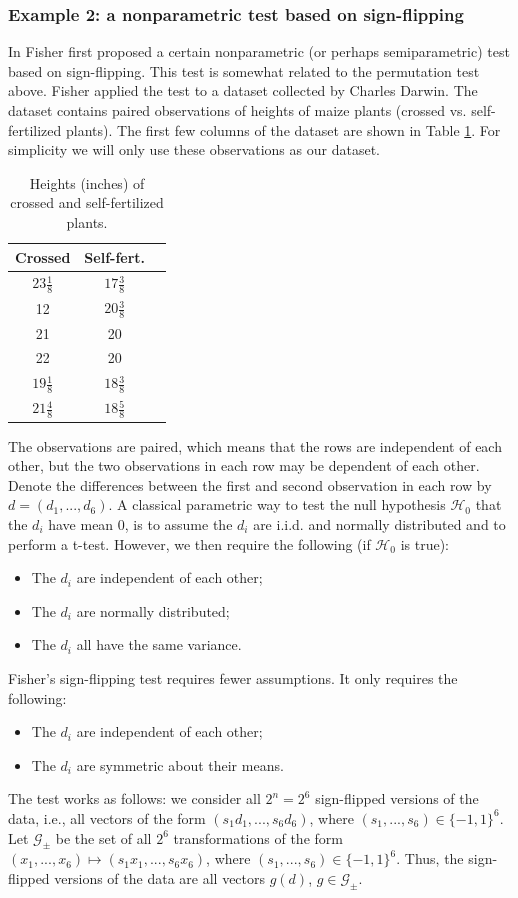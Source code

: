 \documentclass[11pt]{article}
\theoremstyle{plain}
\theoremstyle{definition}
\newcommand{\G}{\mathcal{G}}
\newcommand{\Hy}{\mathcal{H}}
\newcommand{\citt}{\citet}
\begin{document}
\subsubsection{Example 2: a nonparametric test based on sign-flipping} \label{secmaizeflip}

In \citt[][ch. IV]{fisher1935} Fisher first proposed a certain nonparametric (or perhaps semiparametric) test based on sign-flipping. This test is somewhat related to the permutation test above. Fisher applied the test to a dataset collected by Charles Darwin. The dataset contains paired observations of heights of maize plants (crossed vs. self-fertilized plants). The first few columns of the dataset are shown in Table \ref{tab:maizedata}. For simplicity we will only use these observations as our dataset.


\begin{table}[h]
\centering
\begin{tabular}{ccc}
\hline
Crossed & Self-fert.  \\
\hline
$23\frac{1}{8}$ & $17\frac{3}{8}$ \\
12 & $20\frac{3}{8}$  \\
21 & 20 \\
22 & 20\\
$19\frac{1}{8}$ & $18\frac{3}{8}$  \\
$21\frac{4}{8}$ & $18\frac{5}{8}$  \\
\hline
\end{tabular}
\caption{Heights (inches) of crossed and self-fertilized plants.}
\label{tab:maizedata}
\end{table}


 The observations are paired, which means that the rows are independent of each other, but the two observations in each row may be dependent of each other.
 Denote the differences between the first and second observation in each row by $d=(d_1,...,d_6)$.
A classical parametric way to test the null hypothesis  $\Hy_0$ that the $d_i$ have mean 0, is to assume the $d_i$ are i.i.d. and normally distributed and to perform a t-test. However, we then require the following (if $\Hy_0$ is true):
\begin{itemize}
\item The $d_i$ are independent of each other;
\item The $d_i$ are normally distributed;
\item The $d_i$ all have the same variance.
\end{itemize}
Fisher's sign-flipping test requires fewer assumptions. It only requires the following:
\begin{itemize}
\item The $d_i$ are independent of each other;
\item The $d_i$ are symmetric about their means.
\end{itemize}
The test works as follows: we consider all $2^n=2^6$ sign-flipped versions of the data, i.e., all vectors of the form $(s_1 d_1,...,s_6 d_6)$, where $(s_1,...,s_6)\in\{-1,1\}^6$. 
Let $\G_{\pm}$ be the set of all $2^6$ transformations of the form $(x_1,...,x_6)\mapsto (s_1x_1,...,s_6x_6)$, where $(s_1,...,s_6)\in\{-1,1\}^6$. Thus, the sign-flipped versions of the data are all vectors $g(d)$, $g\in \G_{\pm}$.
\end{document}
